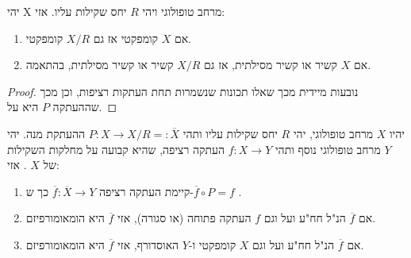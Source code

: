\documentclass{tstextbook}
\begin{document}
\begin{lemma}
יהי X מרחב טופולוגי ויהי \(R\) יחס שקילות עליו. אזי:

  \begin{enumerate}
    \item אם \(X\) קומפקטי אז גם \(X/R\) קומפקטי. 


    \item אם \(X\) קשיר או קשיר מסילתית, אז גם \(X/R\) קשיר או קשיר מסילתית, בהתאמה. 


  \end{enumerate}
\end{lemma}
\begin{proof}
נובעות מיידית מכך שאלו תכונות שנשמרות תחת העתקות רציפות, וכן מכך שההעתקה \(P\) היא על.

\end{proof}
\begin{lemma}
יהיו \(X\) מרחב טופולוגי, יהי \(R\) יחס שקילות עליו ותהי \(P:X\rightarrow X/R=:\overline{X}\) ההעתקת מנה.
יהי \(Y\) מרחב טופולוגי נוסף ותהי \(f:X\rightarrow Y\) העתקה רציפה, שהיא קבועה על מחלקות השקילות של \(X\) . אזי:

  \begin{enumerate}
    \item קיימת העתקה רציפה \(\overline{f}:\overline{X}\rightarrow Y\) כך ש-\(\overline{f}\circ P=f\) . 


    \item אם \(\overline{f}\) הנ"ל חח"ע ועל וגם \(f\) העתקה פתוחה (או סגורה), אזי \(\overline{f}\) היא הומאומורפיזם. 


    \item אם \(\overline{f}\) הנ"ל חח"ע ועל וגם \(X\) קומפקטי ו-\(Y\) האוסדורף, אזי \(\overline{f}\) היא הומאומורפיזם. 


  \end{enumerate}
\end{lemma}
\end{document}
